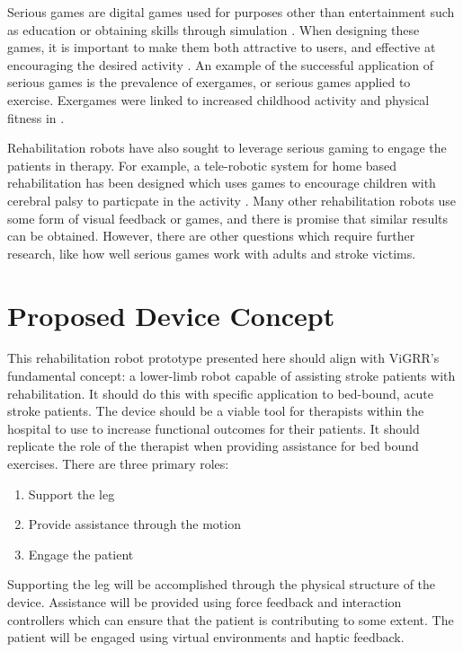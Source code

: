 \documentclass[12pt]{report}
\begin{document}
Serious games are digital games used for purposes other than entertainment such as education or obtaining skills through simulation \cite{Susi}. When designing these games, it is important to make them both attractive to users, and effective at encouraging the desired activity \cite{Sinclair2007}. An example of the successful application of serious games is  the prevalence of exergames, or serious games applied to exercise. Exergames were linked to increased childhood activity and physical fitness in \cite{Staiano2011}. 

Rehabilitation robots have also sought to leverage serious gaming to engage the patients in therapy. For example, a tele-robotic system for home based rehabilitation has been designed which uses games to encourage children with cerebral palsy to particpate in the activity \cite{KaiChen2014}. Many other rehabilitation robots use some form of visual feedback or games, and there is promise that similar results can be obtained. However, there are other questions which require further research, like how well serious games work with adults and stroke victims. 
	
\section{Proposed Device Concept} 

This rehabilitation robot prototype presented here should align with ViGRR's fundamental concept: a lower-limb robot capable of assisting stroke patients with rehabilitation. It should do this with specific application to bed-bound, acute stroke patients. The device should be a viable tool for therapists within the hospital to use to increase functional outcomes for their patients. It should replicate the role of the therapist when providing assistance for bed bound exercises. There are three primary roles:

\begin{enumerate}
	\item Support the leg 
	\item Provide assistance through the motion
	\item Engage the patient
\end{enumerate}

Supporting the leg will be accomplished through the physical structure of the device. Assistance will be provided using force feedback and interaction controllers which can ensure that the patient is contributing to some extent. The patient will be engaged using virtual environments and haptic feedback. 
\end{document}
